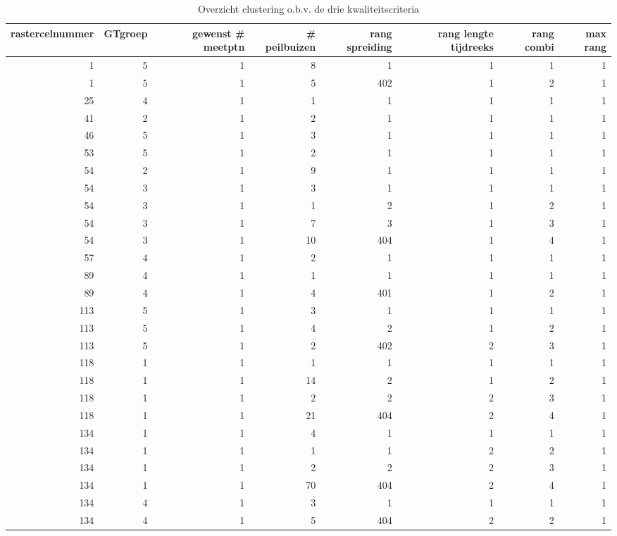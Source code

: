 \documentclass[11pt,]{book}
\begin{document}
\begin{table}

\caption{\label{tab:synthese-clusters-extra-criteria}Overzicht clustering o.b.v. de drie kwaliteitscriteria}
\centering
\begin{tabular}[t]{r|r|r|r|r|r|r|r}
\hline
rastercelnummer & GTgroep & gewenst \# meetptn & \# peilbuizen & rang spreiding & rang lengte tijdreeks & rang combi & max rang\\
\hline
1 & 5 & 1 & 8 & 1 & 1 & 1 & 1\\
\hline
1 & 5 & 1 & 5 & 402 & 1 & 2 & 1\\
\hline
25 & 4 & 1 & 1 & 1 & 1 & 1 & 1\\
\hline
41 & 2 & 1 & 2 & 1 & 1 & 1 & 1\\
\hline
46 & 5 & 1 & 3 & 1 & 1 & 1 & 1\\
\hline
53 & 5 & 1 & 2 & 1 & 1 & 1 & 1\\
\hline
54 & 2 & 1 & 9 & 1 & 1 & 1 & 1\\
\hline
54 & 3 & 1 & 3 & 1 & 1 & 1 & 1\\
\hline
54 & 3 & 1 & 1 & 2 & 1 & 2 & 1\\
\hline
54 & 3 & 1 & 7 & 3 & 1 & 3 & 1\\
\hline
54 & 3 & 1 & 10 & 404 & 1 & 4 & 1\\
\hline
57 & 4 & 1 & 2 & 1 & 1 & 1 & 1\\
\hline
89 & 4 & 1 & 1 & 1 & 1 & 1 & 1\\
\hline
89 & 4 & 1 & 4 & 401 & 1 & 2 & 1\\
\hline
113 & 5 & 1 & 3 & 1 & 1 & 1 & 1\\
\hline
113 & 5 & 1 & 4 & 2 & 1 & 2 & 1\\
\hline
113 & 5 & 1 & 2 & 402 & 2 & 3 & 1\\
\hline
118 & 1 & 1 & 1 & 1 & 1 & 1 & 1\\
\hline
118 & 1 & 1 & 14 & 2 & 1 & 2 & 1\\
\hline
118 & 1 & 1 & 2 & 2 & 2 & 3 & 1\\
\hline
118 & 1 & 1 & 21 & 404 & 2 & 4 & 1\\
\hline
134 & 1 & 1 & 4 & 1 & 1 & 1 & 1\\
\hline
134 & 1 & 1 & 1 & 1 & 2 & 2 & 1\\
\hline
134 & 1 & 1 & 2 & 2 & 2 & 3 & 1\\
\hline
134 & 1 & 1 & 70 & 404 & 2 & 4 & 1\\
\hline
134 & 4 & 1 & 3 & 1 & 1 & 1 & 1\\
\hline
134 & 4 & 1 & 5 & 404 & 2 & 2 & 1\\

\end{tabular}
\end{table}
\end{document}
